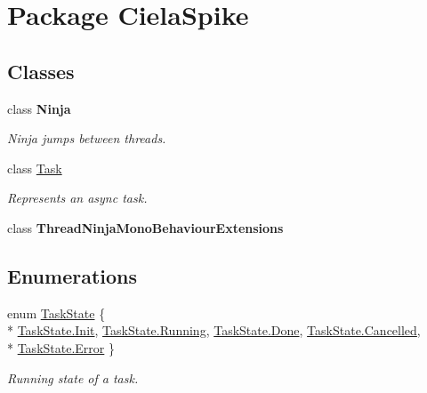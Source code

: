 \hypertarget{namespace_ciela_spike}{}\section{Package Ciela\+Spike}
\label{namespace_ciela_spike}
\subsection*{Classes}
\begin{DoxyCompactItemize}
\item 
class {\bfseries Ninja}
\begin{DoxyCompactList}\small\item\em Ninja jumps between threads. \end{DoxyCompactList}\item 
class \hyperlink{class_ciela_spike_1_1_task}{Task}
\begin{DoxyCompactList}\small\item\em Represents an async task. \end{DoxyCompactList}\item 
class {\bfseries Thread\+Ninja\+Mono\+Behaviour\+Extensions}
\end{DoxyCompactItemize}
\subsection*{Enumerations}
\begin{DoxyCompactItemize}
\item 
enum \hyperlink{namespace_ciela_spike_a4782eb2c0b65a1d593a94740bf994960}{Task\+State} \{ \\*
\hyperlink{namespace_ciela_spike_a4782eb2c0b65a1d593a94740bf994960a95b19f7739b0b7ea7d6b07586be54f36}{Task\+State.\+Init}, 
\hyperlink{namespace_ciela_spike_a4782eb2c0b65a1d593a94740bf994960a5bda814c4aedb126839228f1a3d92f09}{Task\+State.\+Running}, 
\hyperlink{namespace_ciela_spike_a4782eb2c0b65a1d593a94740bf994960af92965e2c8a7afb3c1b9a5c09a263636}{Task\+State.\+Done}, 
\hyperlink{namespace_ciela_spike_a4782eb2c0b65a1d593a94740bf994960aa149e85a44aeec9140e92733d9ed694e}{Task\+State.\+Cancelled}, 
\\*
\hyperlink{namespace_ciela_spike_a4782eb2c0b65a1d593a94740bf994960a902b0d55fddef6f8d651fe1035b7d4bd}{Task\+State.\+Error}
 \}
\begin{DoxyCompactList}\small\item\em Running state of a task. \end{DoxyCompactList}\end{DoxyCompactItemize}


